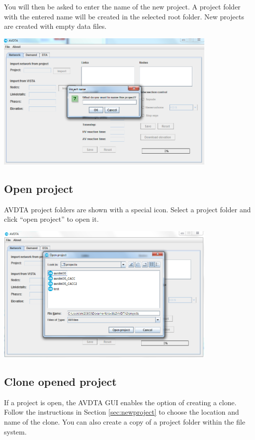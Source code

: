 You will then be asked to enter the name of the new project. A project folder with the entered name will be created in the selected root folder. New projects are created with empty data files. 


\begin{center}
\includegraphics[width=0.8\textwidth]{images/project3.png}
\end{center}

\subsection{Open project}

AVDTA project folders are shown with a special icon. Select a project folder and click ``open project'' to open it.

\begin{center}
\includegraphics[width=0.8\textwidth]{images/project4.png}
\end{center}

\subsection{Clone opened project}

If a project is open, the AVDTA GUI enables the option of creating a clone. Follow the instructions in Section \ref{sec:newproject} to choose the location and name of the clone. You can also create a copy of a project folder within the file system.


